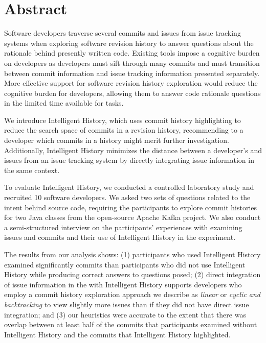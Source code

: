 
\chapter{Abstract}


Software developers traverse several commits and issues from issue tracking systems 
when exploring software revision history to answer questions about the rationale behind presently written code.
Existing tools impose a cognitive burden on developers as developers 
must sift through many commits and must transition between commit information 
and issue tracking information presented separately.
More effective support for software revision history exploration would 
reduce the cognitive burden for developers, allowing them to answer code 
rationale questions in the limited time available for tasks.

We introduce Intelligent History, which uses commit history highlighting to reduce the search space of 
commits in a revision history, recommending to a developer which commits in a history might merit further investigation.
Additionally, Intelligent History minimizes the distance between a developer's  and issues from an issue tracking system
by directly integrating issue information in the same context.

To evaluate Intelligent History, we conducted a controlled laboratory study and recruited 10 software developers.
We asked two sets of questions related to the intent behind source code, requiring the participants to explore 
commit histories for two Java classes from the open-source Apache Kafka project.
We also conduct a semi-structured interview on the participants' experiences with examining issues and commits 
and their use of Intelligent History in the experiment.

The results from our analysis shows:
(1) participants who used Intelligent History examined significantly
 commits than participants who did not use Intelligent History
while producing correct answers to questions posed;
(2) direct integration of issue information in the 
with Intelligent History supports developers who employ a commit history exploration approach
we describe as \textit{linear} or \textit{cyclic and backtracking} to view slightly more issues than if they did not have
direct issue integration; and
(3) our heuristics were accurate to the extent that there was overlap between at least half of the commits
that participants examined without Intelligent History and the commits that Intelligent History
highlighted.

